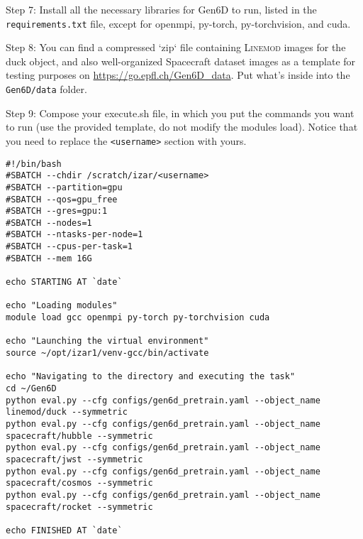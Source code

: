 \bigskip


\noindent Step 7: Install all the necessary libraries for Gen6D to run, listed in the \texttt{requirements.txt} file, except for openmpi, py-torch, py-torchvision, and cuda.

\bigskip


\noindent Step 8: You can find a compressed `zip` file containing \textsc{Linemod} images for the duck object, and also well-organized Spacecraft dataset images as a template for testing purposes on \url{https://go.epfl.ch/Gen6D_data}. Put what's inside into the \texttt{Gen6D/data} folder.

\bigskip


\noindent Step 9: Compose your execute.sh file, in which you put the commands you want to run (use the provided template, do not modify the modules load). Notice that you need to replace the \texttt{<username>} section with yours.

\bigskip

\begin{lstlisting}[style=bashstyle, caption={Bash script \texttt{execute.sh} to run a machine learning model on Scitas Izar EPFL. While the overall structure remains consistent, this script is specific to Gen6D's architecture.}]
#!/bin/bash
#SBATCH --chdir /scratch/izar/<username>
#SBATCH --partition=gpu
#SBATCH --qos=gpu_free
#SBATCH --gres=gpu:1
#SBATCH --nodes=1
#SBATCH --ntasks-per-node=1
#SBATCH --cpus-per-task=1
#SBATCH --mem 16G

echo STARTING AT `date`

echo "Loading modules"
module load gcc openmpi py-torch py-torchvision cuda

echo "Launching the virtual environment"
source ~/opt/izar1/venv-gcc/bin/activate

echo "Navigating to the directory and executing the task"
cd ~/Gen6D
python eval.py --cfg configs/gen6d_pretrain.yaml --object_name linemod/duck --symmetric                                    
python eval.py --cfg configs/gen6d_pretrain.yaml --object_name spacecraft/hubble --symmetric
python eval.py --cfg configs/gen6d_pretrain.yaml --object_name spacecraft/jwst --symmetric
python eval.py --cfg configs/gen6d_pretrain.yaml --object_name spacecraft/cosmos --symmetric
python eval.py --cfg configs/gen6d_pretrain.yaml --object_name spacecraft/rocket --symmetric

echo FINISHED AT `date`
\end{lstlisting}

\bigskip


